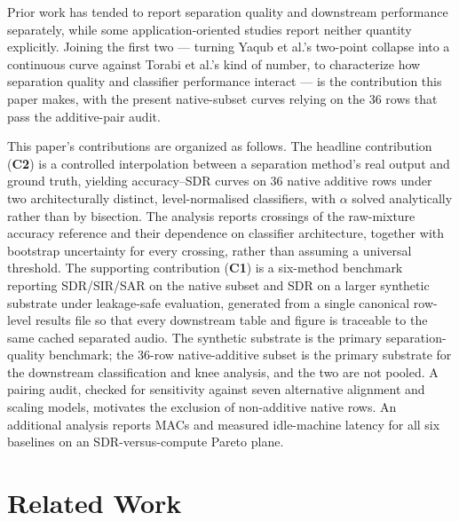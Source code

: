 \documentclass[journal]{IEEEtran}
\begin{document}
Prior work has tended to report separation quality and downstream performance separately, while some application-oriented studies report neither quantity explicitly. Joining the first two --- turning Yaqub et al.'s two-point collapse into a continuous curve against Torabi et al.'s kind of number, to characterize how separation quality and classifier performance interact --- is the contribution this paper makes, with the present native-subset curves relying on the 36 rows that pass the additive-pair audit.

This paper's contributions are organized as follows. The headline contribution (\textbf{C2}) is a controlled interpolation between a separation method's real output and ground truth, yielding accuracy--SDR curves on 36 native additive rows under two architecturally distinct, level-normalised classifiers, with $\alpha$ solved analytically rather than by bisection. The analysis reports crossings of the raw-mixture accuracy reference and their dependence on classifier architecture, together with bootstrap uncertainty for every crossing, rather than assuming a universal threshold. The supporting contribution (\textbf{C1}) is a six-method benchmark reporting SDR/SIR/SAR on the native subset and SDR on a larger synthetic substrate under leakage-safe evaluation, generated from a single canonical row-level results file so that every downstream table and figure is traceable to the same cached separated audio. The synthetic substrate is the primary separation-quality benchmark; the 36-row native-additive subset is the primary substrate for the downstream classification and knee analysis, and the two are not pooled. A pairing audit, checked for sensitivity against seven alternative alignment and scaling models, motivates the exclusion of non-additive native rows. An additional analysis reports MACs and measured idle-machine latency for all six baselines on an SDR-versus-compute Pareto plane.

\section{Related Work}
\end{document}
